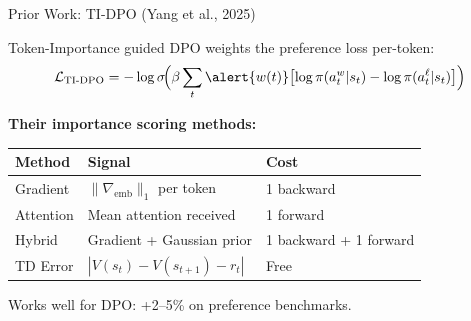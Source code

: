 \documentclass[aspectratio=169,10pt]{beamer}
\begin{document}
\begin{frame}{Prior Work: TI-DPO (Yang et al., 2025)}

Token-Importance guided DPO weights the preference loss per-token:
\[
\mathcal{L}_{\text{TI-DPO}} = -\log\sigma\!\Bigl(\beta\sum_t \alert{w(t)}\bigl[\log\pi(a_t^w|s_t) - \log\pi(a_t^\ell|s_t)\bigr]\Bigr)
\]

\vspace{0.3cm}

\textbf{Their importance scoring methods:}

\vspace{0.2cm}
\begin{table}
\small
\begin{tabular}{lll}
\toprule
Method & Signal & Cost \\
\midrule
Gradient & $\|\nabla_{\text{emb}}\|_1$ per token & 1 backward \\
Attention & Mean attention received & 1 forward \\
Hybrid & Gradient + Gaussian prior & 1 backward + 1 forward \\
TD Error & $|V(s_t) - V(s_{t+1}) - r_t|$ & Free \\
\bottomrule
\end{tabular}
\end{table}

\vspace{0.2cm}
Works well for DPO: +2--5\% on preference benchmarks.

\end{frame}
\end{document}
